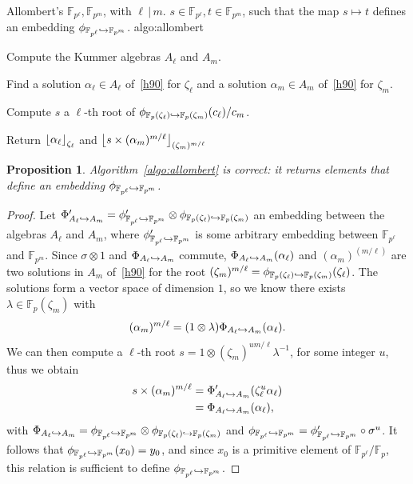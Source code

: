 \documentclass{sig-alternate}
\newtheorem{proposition}{Proposition}
\begin{document}
\begin{algorithm_endline}
  {Allombert's}
  {$\mathbb{F}_{p^\ell}, \mathbb{F}_{p^m}$, with $\ell\,|\,m$.}
  {$s\in\mathbb{F}_{p^\ell}, t\in\mathbb{F}_{p^m}$, such that the map $s\mapsto t$
  defines an embedding $\phi_{\mathbb{F}_{p^{\ell}}\hookrightarrow\mathbb{F}_{p^{m}}}$.}
  {algo:allombert}
\item Compute the Kummer algebras $A_\ell$ and $A_m$.
\item Find a solution $\alpha_\ell\in A_\ell$ of~\eqref{h90} for $\zeta_\ell$
  and a solution $\alpha_m\in A_m$ of~\eqref{h90} for $\zeta_m$.
\item Compute $s$ a $\ell$-th root of $\phi_{\mathbb{F}_{p}(\zeta_{\ell})\hookrightarrow\mathbb{F}_{p}(\zeta_{m})}(c_\ell)/c_m$.
\item Return $\left\lfloor \alpha_{\ell} \right\rfloor_{\zeta_\ell}$ and $\left\lfloor s\times
    (\alpha_m)^{m/\ell} \right\rfloor_{(\zeta_m)^{m/\ell}}$
\end{algorithm_endline}

\begin{proposition}
  Algorithm~\ref{algo:allombert} is correct: it returns elements that define an
  embedding $\phi_{\mathbb{F}_{p^{\ell}}\hookrightarrow\mathbb{F}_{p^{m}}}$.
\end{proposition}
\begin{proof}
  Let $\Phi_{A_{\ell}\hookrightarrow A_{m}}'=\phi_{\mathbb{F}_{p^{\ell}}\hookrightarrow\mathbb{F}_{p^{m}}}'\otimes\phi_{\mathbb{F}_{p}(\zeta_{\ell})\hookrightarrow\mathbb{F}_{p}(\zeta_{m})}$ an embedding
  between the algebras $A_\ell$ and $A_m$, where $\phi_{\mathbb{F}_{p^{\ell}}\hookrightarrow\mathbb{F}_{p^{m}}}'$ is some
  arbitrary embedding between $\mathbb{F}_{p^\ell}$ and $\mathbb{F}_{p^m}$.
  Since $\sigma\otimes1$ and $\Phi_{A_{\ell}\hookrightarrow A_{m}}$ commute,
  $\Phi_{A_{\ell}\hookrightarrow A_{m}}(\alpha_\ell)$ and $(\alpha_m)^{(m/\ell)}$ are two solutions
  in $A_m$ of~\eqref{h90} for the root $(\zeta_m)^{m/\ell} =
  \phi_{\mathbb{F}_{p}(\zeta_{\ell})\hookrightarrow\mathbb{F}_{p}(\zeta_{m})}(\zeta_\ell)$. The solutions form a vector space of
  dimension $1$, so we know there exists $\lambda\in\mathbb{F}_{p}(\zeta_m)$
  with
  \[
    (\alpha_m)^{m/\ell} = (1\otimes\lambda)\Phi_{A_{\ell}\hookrightarrow A_{m}}(\alpha_\ell).
  \]
  We can then compute a $\ell$-th root $s = 1\otimes(\zeta_{m})^{um/\ell}\lambda^{-1}$, for some
  integer $u$, thus we obtain
  \begin{align*}
    s\times(\alpha_m)^{m/\ell} &= \Phi_{A_{\ell}\hookrightarrow A_{m}}'(\zeta_\ell^u\alpha_\ell)\\
    &= \Phi_{A_{\ell}\hookrightarrow A_{m}}(\alpha_\ell),
  \end{align*}
  with $\Phi_{A_{\ell}\hookrightarrow A_{m}}=\phi_{\mathbb{F}_{p^{\ell}}\hookrightarrow\mathbb{F}_{p^{m}}}\otimes\phi_{\mathbb{F}_{p}(\zeta_{\ell})\hookrightarrow\mathbb{F}_{p}(\zeta_{m})}$ and
  $\phi_{\mathbb{F}_{p^{\ell}}\hookrightarrow\mathbb{F}_{p^{m}}} = \phi_{\mathbb{F}_{p^{\ell}}\hookrightarrow\mathbb{F}_{p^{m}}}'\circ\sigma^u$. It follows that
  $\phi_{\mathbb{F}_{p^{\ell}}\hookrightarrow\mathbb{F}_{p^{m}}}(x_0)=y_0$, and since $x_0$ is a primitive element of
  $\mathbb{F}_{p^\ell}/\mathbb{F}_{p}$, this relation is sufficient to define
  $\phi_{\mathbb{F}_{p^{\ell}}\hookrightarrow\mathbb{F}_{p^{m}}}$.
\end{proof}
\end{document}
